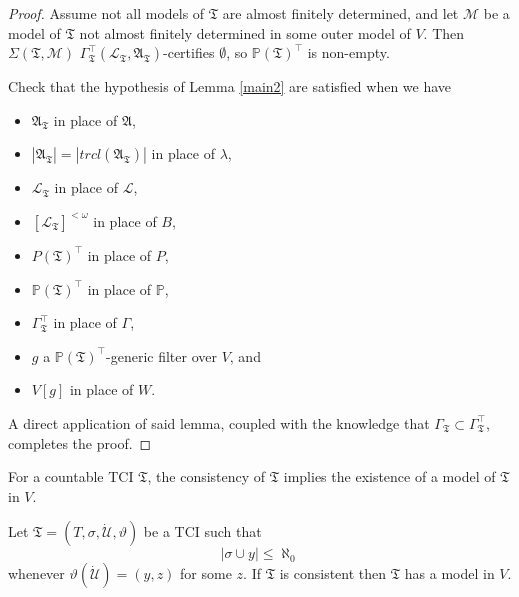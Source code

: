 \documentclass[12pt]{article}
\numberwithin{equation}{section}
\begin{document}
\begin{proof}
Assume not all models of $\mathfrak{T}$ are almost finitely determined, and let $\mathcal{M}$ be a model of $\mathfrak{T}$ not almost finitely determined in some outer model of $V$. Then $\Sigma(\mathfrak{T}, \mathcal{M})$ $\Gamma_{\mathfrak{T}}^{\top} (\mathcal{L}_{\mathfrak{T}}, \mathfrak{A}_{\mathfrak{T}})$-certifies $\emptyset$, so $\mathbb{P}(\mathfrak{T})^{\top}$ is non-empty.

Check that the hypothesis of Lemma \ref{main2} are satisfied when we have 
\begin{itemize}
    \item $\mathfrak{A}_{\mathfrak{T}}$ in place of $\mathfrak{A}$,
    \item $|\mathfrak{A}_{\mathfrak{T}}| = |trcl(\mathfrak{A}_{\mathfrak{T}})|$ in place of $\lambda$,
    \item $\mathcal{L}_{\mathfrak{T}}$ in place of $\mathcal{L}$,
    \item $[\mathcal{L}_{\mathfrak{T}}]^{< \omega}$ in place of $B$,
    \item $P(\mathfrak{T})^{\top}$ in place of $P$,
    \item $\mathbb{P}(\mathfrak{T})^{\top}$ in place of $\mathbb{P}$,
    \item $\Gamma_{\mathfrak{T}}^{\top}$ in place of $\Gamma$, 
    \item $g$ a $\mathbb{P}(\mathfrak{T})^{\top}$-generic filter over $V$, and
    \item $V[g]$ in place of $W$.
\end{itemize}
A direct application of said lemma, coupled with the knowledge that $\Gamma_{\mathfrak{T}} \subset \Gamma_{\mathfrak{T}}^{\top}$, completes the proof. 
\end{proof}

For a countable TCI $\mathfrak{T}$, the consistency of $\mathfrak{T}$ implies the existence of a model of $\mathfrak{T}$ in $V$. 

\begin{lem}\label{modelinV}
Let $\mathfrak{T} = (T, \sigma, \dot{\mathcal{U}}, \vartheta)$ be a TCI such that $$|\sigma \cup y| \leq \aleph_0$$ whenever $\vartheta(\dot{\mathcal{U}}) = (y, z)$ for some $z$. If $\mathfrak{T}$ is consistent then $\mathfrak{T}$ has a model in $V$.
\end{lem}
\end{document}
